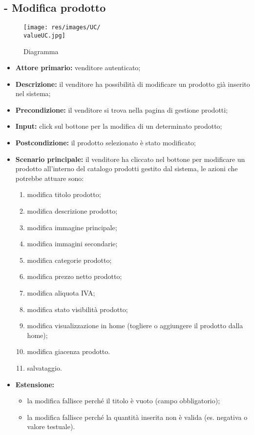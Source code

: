 \stepUserCase
\subsection{- Modifica prodotto}
\begin{figure}[H]
    \centering
    \texttt{[image: res/images/UC/\\valueUC.jpg]}
    \caption{Diagramma }
\end{figure}
\begin{itemize}
    \item \textbf{Attore primario:} venditore autenticato;
    \item \textbf{Descrizione:} il venditore ha possibilità di modificare un prodotto già inserito nel sistema;
    \item \textbf{Precondizione:} il venditore si trova nella pagina di gestione prodotti;
    \item \textbf{Input:} click sul bottone per la modifica di un determinato prodotto;
    \item \textbf{Postcondizione:} il prodotto selezionato è stato modificato;
    \item \textbf{Scenario principale:} il venditore ha cliccato nel bottone per modificare un prodotto all’interno del catalogo prodotti gestito dal sistema, le azioni che potrebbe attuare sono:
          \begin{enumerate}
              \item modifica titolo prodotto;
              \item modifica descrizione prodotto;
              \item modifica immagine principale;
              \item modifica immagini secondarie;
              \item modifica categorie prodotto;
              \item modifica prezzo netto prodotto;
              \item modifica aliquota IVA;
              \item modifica stato visibilità prodotto;
              \item modifica visualizzazione in home (togliere o aggiungere il prodotto dalla home);
              \item modifica giacenza prodotto.
              \item salvataggio.
          \end{enumerate}
    \item \textbf{Estensione:}
          \begin{itemize}
              \item la modifica fallisce perché il titolo è vuoto (campo obbligatorio);
              \item la modifica fallisce perché la quantità inserita non è valida (es. negativa o valore testuale).
          \end{itemize}
\end{itemize}

